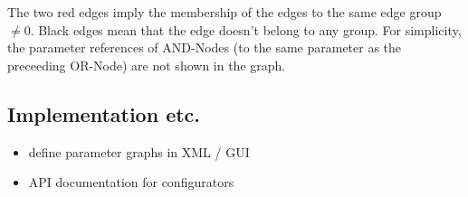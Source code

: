 The two red edges imply the membership of the edges to the same edge group $\neq 0$. Black edges mean that the edge doesn't belong to any group.
For simplicity, the parameter references of AND-Nodes (to the same parameter as the preceeding OR-Node) are not shown in the graph.
\clearpage
\subsection{Implementation etc.}
\begin{itemize}
\item define parameter graphs in XML / GUI 
\item API documentation for configurators
\end{itemize}